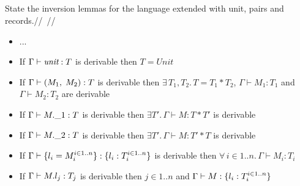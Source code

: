 \subsection{}

State the inversion lemmas for the language extended with unit, pairs and records.//~//

\begin{itemize}
  \item ...
	\item If $\Gamma \vdash \emph{unit}: T$ is derivable then $T = Unit$
	\item If $\Gamma \vdash (M_1,\;M_2): T$ is derivable then
	      $\exists\,T_1, T_2.\, T = T_1 \ast T_2$, $\Gamma \vdash M_1: T_1$ and
	      $\Gamma \vdash M_2: T_2$ are derivable
	\item If $\Gamma \vdash M.\_1: T$ is derivable then
	      $\exists T'.\, \Gamma \vdash M: T \ast T'$ is derivable
	\item If $\Gamma \vdash M.\_2: T$ is derivable then
	      $\exists T'.\, \Gamma \vdash M: T' \ast T$ is derivable
	\item If $\Gamma \vdash \{l_i=M_i^{i \in 1..n}\}: \{l_i:T_i^{i \in 1..n}\}$ is derivable
	      then $\forall\, i \in 1..n.\, \Gamma \vdash M_i: T_i$
	\item If $\Gamma \vdash M.l_j: T_j$ is derivable then $j \in 1..n$ and
	      $\Gamma \vdash M: \{l_i: T_i^{i \in 1..n}\}$
\end{itemize}
